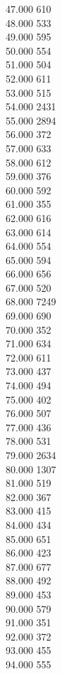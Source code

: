 { 47.000	610 \\
 48.000	533 \\
 49.000	595 \\
 50.000	554 \\
 51.000	504 \\
 52.000	611 \\
 53.000	515 \\
 54.000	2431 \\
 55.000	2894 \\
 56.000	372 \\
 57.000	633 \\
 58.000	612 \\
 59.000	376 \\
 60.000	592 \\
 61.000	355 \\
 62.000	616 \\
 63.000	614 \\
 64.000	554 \\
 65.000	594 \\
 66.000	656 \\
 67.000	520 \\
 68.000	7249 \\
 69.000	690 \\
 70.000	352 \\
 71.000	634 \\
 72.000	611 \\
 73.000	437 \\
 74.000	494 \\
 75.000	402 \\
 76.000	507 \\
 77.000	436 \\
 78.000	531 \\
 79.000	2634 \\
 80.000	1307 \\
 81.000	519 \\
 82.000	367 \\
 83.000	415 \\
 84.000	434 \\
 85.000	651 \\
 86.000	423 \\
 87.000	677 \\
 88.000	492 \\
 89.000	453 \\
 90.000	579 \\
 91.000	351 \\
 92.000	372 \\
 93.000	455 \\
 94.000	555 \\
}
